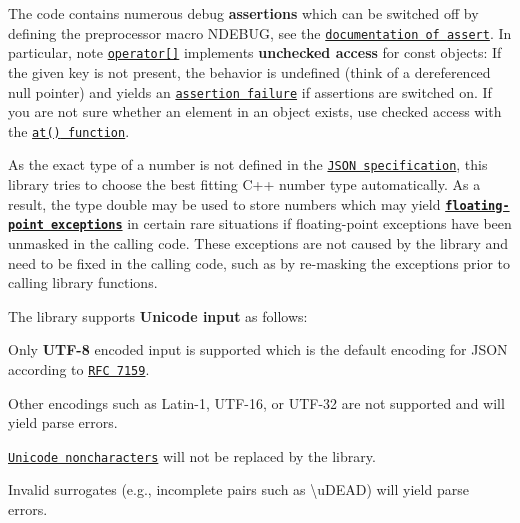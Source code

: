 \begin{DoxyItemize}
\item The code contains numerous debug {\bfseries assertions} which can be switched off by defining the preprocessor macro {\ttfamily N\+D\+E\+B\+UG}, see the \href{http://en.cppreference.com/w/cpp/error/assert}{\tt documentation of {\ttfamily assert}}. In particular, note \href{https://nlohmann.github.io/json/classnlohmann_1_1basic__json_a2e26bd0b0168abb61f67ad5bcd5b9fa1.html#a2e26bd0b0168abb61f67ad5bcd5b9fa1}{\tt {\ttfamily operator\mbox{[}\mbox{]}}} implements {\bfseries unchecked access} for const objects\+: If the given key is not present, the behavior is undefined (think of a dereferenced null pointer) and yields an \href{https://github.com/nlohmann/json/issues/289}{\tt assertion failure} if assertions are switched on. If you are not sure whether an element in an object exists, use checked access with the \href{https://nlohmann.github.io/json/classnlohmann_1_1basic__json_a674de1ee73e6bf4843fc5dc1351fb726.html#a674de1ee73e6bf4843fc5dc1351fb726}{\tt {\ttfamily at()} function}.
\item As the exact type of a number is not defined in the \href{http://rfc7159.net/rfc7159}{\tt J\+S\+ON specification}, this library tries to choose the best fitting C++ number type automatically. As a result, the type {\ttfamily double} may be used to store numbers which may yield \href{https://github.com/nlohmann/json/issues/181}{\tt {\bfseries floating-\/point exceptions}} in certain rare situations if floating-\/point exceptions have been unmasked in the calling code. These exceptions are not caused by the library and need to be fixed in the calling code, such as by re-\/masking the exceptions prior to calling library functions.
\item The library supports {\bfseries Unicode input} as follows\+:
\begin{DoxyItemize}
\item Only {\bfseries U\+T\+F-\/8} encoded input is supported which is the default encoding for J\+S\+ON according to \href{http://rfc7159.net/rfc7159#rfc.section.8.1}{\tt R\+FC 7159}.
\item Other encodings such as Latin-\/1, U\+T\+F-\/16, or U\+T\+F-\/32 are not supported and will yield parse errors.
\item \href{http://www.unicode.org/faq/private_use.html#nonchar1}{\tt Unicode noncharacters} will not be replaced by the library.
\item Invalid surrogates (e.\+g., incomplete pairs such as {\ttfamily \textbackslash{}u\+D\+E\+AD}) will yield parse errors.

\end{DoxyItemize}
\end{DoxyItemize}

